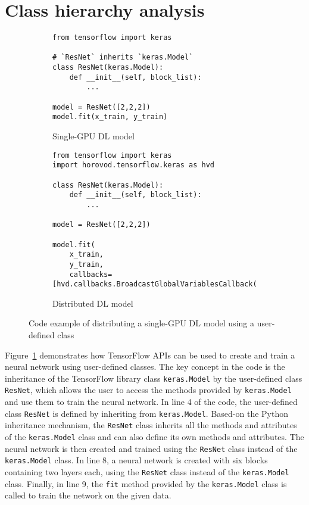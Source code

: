\section{Class hierarchy analysis}\label{sec:cha}
\begin{figure}[!ht]
  \centering
  \begin{subfigure}[b]{0.35\textwidth}
    \begin{lstlisting}[style=mpython]
from tensorflow import keras

# `ResNet` inherits `keras.Model`
class ResNet(keras.Model):
    def __init__(self, block_list):
        ...

model = ResNet([2,2,2])
model.fit(x_train, y_train)\end{lstlisting}
    \caption{Single-GPU DL model}
    \label{fig:cha:tfex:a}
  \end{subfigure}
  \hspace{3mm}
  \begin{subfigure}[b]{0.6\textwidth}
    \begin{lstlisting}[style=mpython]
from tensorflow import keras
import horovod.tensorflow.keras as hvd

class ResNet(keras.Model):
    def __init__(self, block_list):
        ...

model = ResNet([2,2,2])

model.fit(
    x_train,
    y_train,
    callbacks=[hvd.callbacks.BroadcastGlobalVariablesCallback(0)])\end{lstlisting}
    \caption{Distributed DL model}
    \label{fig:cha:tfex:b}
  \end{subfigure}

  \caption{Code example of distributing a single-GPU DL model using a user-defined class}
  \label{fig:cha:tfex}
\end{figure}

Figure~\ref{fig:cha:tfex:a} demonstrates how TensorFlow APIs can be used to
create and train a neural network using user-defined classes. 
The key concept in the code is the inheritance of the TensorFlow library class
{\tt keras.Model} by the user-defined class {\tt ResNet}, which allows the user
to access the methods provided by {\tt keras.Model} and use them to train the
neural network.
In line 4 of the code, the user-defined class {\tt ResNet} is defined by
inheriting from {\tt keras.Model}. 
Based-on the Python inheritance mechanism, the {\tt ResNet} class inherits all
the methods and attributes of the {\tt keras.Model} class and can also define
its own methods and attributes. 
The neural network is then created and trained using the {\tt ResNet} class
instead of the {\tt keras.Model} class. 
In line 8, a neural network is created with six blocks containing two layers
each, using the {\tt ResNet} class instead of the {\tt keras.Model} class.
Finally, in line 9, the {\tt fit} method provided by the {\tt keras.Model}
class is called to train the network on the given data.

